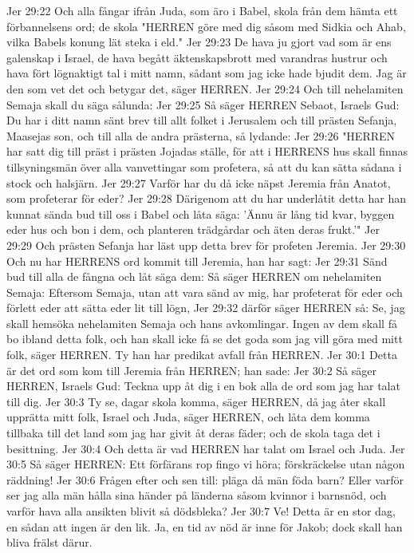Jer 29:22  Och alla fångar ifrån Juda, som äro i Babel, skola från dem hämta ett förbannelsens ord; de skola "HERREN göre med dig såsom med Sidkia och Ahab, vilka Babels konung lät steka i eld."
Jer 29:23  De hava ju gjort vad som är ens galenskap i Israel, de hava begått äktenskapsbrott med varandras hustrur och hava fört lögnaktigt tal i mitt namn, sådant som jag icke hade bjudit dem. Jag är den som vet det och betygar det, säger HERREN.
Jer 29:24  Och till nehelamiten Semaja skall du säga sålunda:
Jer 29:25  Så säger HERREN Sebaot, Israels Gud: Du har i ditt namn sänt brev till allt folket i Jerusalem och till prästen Sefanja, Maasejas son, och till alla de andra prästerna, så lydande:
Jer 29:26  "HERREN har satt dig till präst i prästen Jojadas ställe, för att i HERRENS hus skall finnas tillsyningsmän över alla vanvettingar som profetera, så att du kan sätta sådana i stock och halsjärn.
Jer 29:27  Varför har du då icke näpst Jeremia från Anatot, som profeterar för eder?
Jer 29:28  Därigenom att du har underlåtit detta har han kunnat sända bud till oss i Babel och låta säga: 'Ännu är lång tid kvar, byggen eder hus och bon i dem, och planteren trädgårdar och äten deras frukt.'"
Jer 29:29  Och prästen Sefanja har läst upp detta brev för profeten Jeremia.
Jer 29:30  Och nu har HERRENS ord kommit till Jeremia, han har sagt:
Jer 29:31  Sänd bud till alla de fångna och låt säga dem: Så säger HERREN om nehelamiten Semaja: Eftersom Semaja, utan att vara sänd av mig, har profeterat för eder och förlett eder att sätta eder lit till lögn,
Jer 29:32  därför säger HERREN så: Se, jag skall hemsöka nehelamiten Semaja och hans avkomlingar. Ingen av dem skall få bo ibland detta folk, och han skall icke få se det goda som jag vill göra med mitt folk, säger HERREN. Ty han har predikat avfall från HERREN.
Jer 30:1  Detta är det ord som kom till Jeremia från HERREN; han sade:
Jer 30:2  Så säger HERREN, Israels Gud: Teckna upp åt dig i en bok alla de ord som jag har talat till dig.
Jer 30:3  Ty se, dagar skola komma, säger HERREN, då jag åter skall upprätta mitt folk, Israel och Juda, säger HERREN, och låta dem komma tillbaka till det land som jag har givit åt deras fäder; och de skola taga det i besittning.
Jer 30:4  Och detta är vad HERREN har talat om Israel och Juda.
Jer 30:5  Så säger HERREN: Ett förfärans rop fingo vi höra; förskräckelse utan någon räddning!
Jer 30:6  Frågen efter och sen till: pläga då män föda barn? Eller varför ser jag alla män hålla sina händer på länderna såsom kvinnor i barnsnöd, och varför hava alla ansikten blivit så dödsbleka?
Jer 30:7  Ve! Detta är en stor dag, en sådan att ingen är den lik. Ja, en tid av nöd är inne för Jakob; dock skall han bliva frälst därur.
